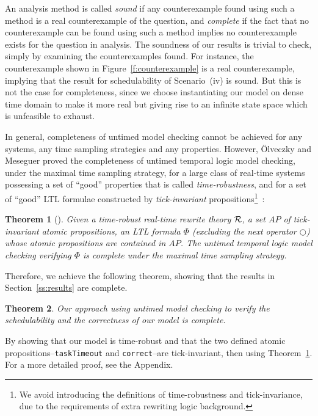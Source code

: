 \documentclass[10pt,journal]{IEEEtran}
\newtheorem{theorem}{Theorem}
\begin{document}
{An analysis method is called \emph{sound} if any counterexample found
using such a method is a real counterexample of the question, and
\emph{complete} if the fact that no counterexample can be found using
such a method implies no counterexample exists for the question in
analysis. The soundness of our results is trivial to check, simply by
examining the counterexamples found. For instance, the counterexample
shown in Figure~\ref{f:counterexample} is a real counterexample,
implying that the result for schedulability of Scenario~(iv) is
sound. But this is not the case for completeness, since we choose
instantiating our model on dense time domain to make it more real but
giving rise to an infinite state space which is unfeasible to exhaust.

In general, completeness of untimed model checking cannot be achieved
for any systems, any time sampling strategies and any
properties. However, \"Olveczky and Meseguer proved the completeness
of untimed temporal logic model checking, under the maximal time
sampling strategy, for a large class of real-time systems possessing a
set of ``good'' properties that is called \emph{time-robustness}, and
for a set of ``good'' LTL formulae constructed by
\emph{tick-invariant} propositions\footnote{We avoid introducing the
  definitions of time-robustness and tick-invariance, due to the
  requirements of extra rewriting logic
  background.}~\cite{DBLP:journals/entcs/OlveczkyM07a}:
\begin{theorem}[\cite{DBLP:journals/entcs/OlveczkyM07a}]
\label{t:completeness}
Given a time-robust real-time rewrite theory $\cal R$, a set $AP$ of
tick-invariant atomic propositions, an LTL formula $\Phi$ (excluding
the \emph{next} operator $\bigcirc$) whose atomic propositions are
contained in $AP$. The untimed temporal logic model checking verifying
$\Phi$ is \emph{complete} under the maximal time sampling strategy.
\end{theorem}

Therefore, we achieve the following theorem, showing that the results
in Section~\ref{ss:results} are complete.
\begin{theorem}
\label{t:main}
Our approach using untimed model checking to verify the schedulability
and the correctness of our model is complete.
\end{theorem}
\begin{IEEEproof}
By showing that our model is time-robust and that the two defined
atomic propositions--\verb|taskTimeout| and \verb|correct|--are
tick-invariant, then using Theorem~\ref{t:completeness}. For a more
detailed proof, see the Appendix.
\end{IEEEproof}


}
\end{document}
